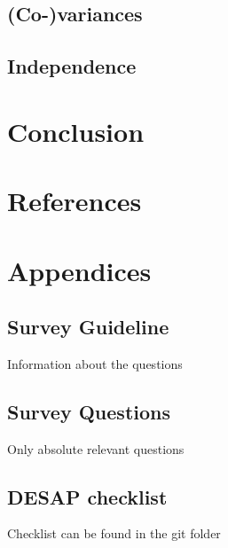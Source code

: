 \documentclass[12pt,a4paper,paper=a4,oneside,titlepage,pdftex]{scrartcl}
\begin{document}
\subsection{(Co-)variances}

\subsection{Independence}

\section{Conclusion}

\section*{References}

\renewcommand\refname{\vskip -1cm}


\section*{Appendices}

\subsection*{Survey Guideline}
Information about the questions

\subsection*{Survey Questions}
Only absolute relevant questions

\subsection*{DESAP checklist}
Checklist can be found in the git folder
\end{document}
